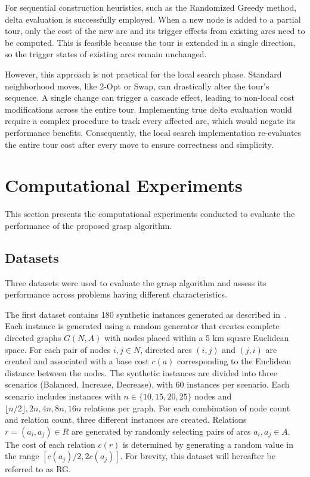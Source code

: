 \documentclass[twocolumn, switch]{article} %
\begin{document}
For sequential construction heuristics, such as the Randomized Greedy method, delta evaluation is successfully employed. When a new node is added to a partial tour, only the cost of the new arc and its trigger effects from existing arcs need to be computed. This is feasible because the tour is extended in a single direction, so the trigger states of existing arcs remain unchanged.

However, this approach is not practical for the local search phase. Standard neighborhood moves, like 2-Opt or Swap, can drastically alter the tour's sequence. A single change can trigger a cascade effect, leading to non-local cost modifications across the entire tour. Implementing true delta evaluation would require a complex procedure to track every affected arc, which would negate its performance benefits. Consequently, the local search implementation re-evaluates the entire tour cost after every move to ensure correctness and simplicity.

\section{Computational Experiments}
This section presents the computational experiments conducted to evaluate the performance of the proposed \gls{grasp} algorithm.

\subsection{Datasets}

Three datasets were used to evaluate the \gls{grasp} algorithm and assess its performance across problems having different characteristics.

The first dataset contains 180 synthetic instances generated as described in~\citet{Cerrone}.
Each instance is generated using a random generator that creates complete directed graphs $G(N,A)$ 
with nodes placed within a 5 km square Euclidean space. 
For each pair of nodes $i, j \in N$, directed arcs $(i, j)$ and $(j, i)$ are created and associated with a base cost $c(a)$ 
corresponding to the Euclidean distance between the nodes. The synthetic instances are divided into three scenarios 
(Balanced, Increase, Decrease), with 60 instances per scenario. Each scenario includes instances with $n \in \{10, 15, 20, 25\}$ 
nodes and $\lfloor n/2 \rfloor, 2n, 4n, 8n, 16n$ relations per graph. For each combination of node count and relation count, three 
different instances are created.
Relations $r = (a_i, a_j) \in R$ are generated by randomly selecting pairs of arcs $a_i, a_j \in A$. The cost of each relation $c(r)$ 
is determined by generating a random value in the range $[c(a_j)/2, 2c(a_j)]$. For brevity, this dataset will hereafter be referred to as RG.
\end{document}
